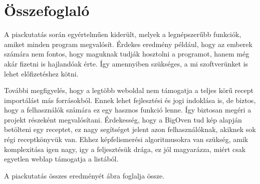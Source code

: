 \documentclass[12pt]{report}
\theoremstyle{definition}
\begin{document}
\section{Összefoglaló}
A piackutatás során egyértelműen kiderült, melyek a legnépszerűbb funkciók, amiket minden program megvalósít. Érdekes eredmény például, hogy az emberek számára nem fontos, hogy maguknak tudják hosztolni a programot, hanem még akár fizetni is hajlandóak érte. Így amennyiben szükséges, a mi szoftverünket is lehet előfizetéshez kötni.

További megfigyelés, hogy a legtöbb weboldal nem támogatja a teljes körű recept importálást más forrásokból. Ennek lehet fejlesztési és jogi indoklása is, de biztos, hogy a felhasználók számára ez egy hasznos funkció lenne. Így biztosan megéri a projekt részeként megvalósítani. Érdekesség, hogy a BigOven tud kép alapján betölteni egy receptet, ez nagy segítséget jelent azon felhasználóknak, akiknek sok régi receptkönyvük van. Ehhez képfelismerési algoritmusokra van szükség, amik komplexitása igen nagy, igy a feljesztésük drága, ez jól magyarázza, miért csak egyetlen weblap támogatja a listából.

A piackutatás összes eredményét \az{\ref{fig:table}} ábra foglalja össze. 


\newcommand{\cmark}{\ding{51}}%
\newcommand{\xmark}{\ding{55}}%
\end{document}
